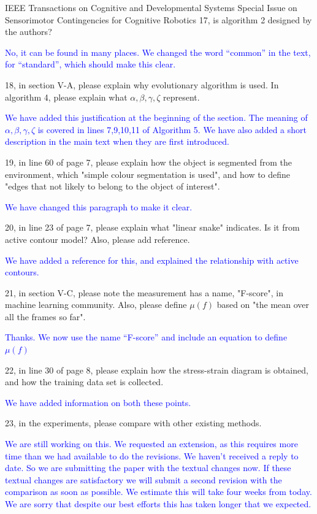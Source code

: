 \documentclass[a4paper,12pt]{letter}
\newcommand{\comment}[1]{\textcolor{blue}{#1}}
\begin{document}
\begin{letter}{IEEE Transactions on Cognitive and Developmental Systems\newline
Special Issue on Sensorimotor Contingencies for Cognitive Robotics}
17, is algorithm 2 designed by the authors?

\comment{No, it can be found in many places.  We changed the word ``common'' in the text, for ``standard'', which should make this clear.}

18, in section V-A, please explain why evolutionary algorithm is used. In algorithm 4, please explain what $\alpha, \beta, \gamma, \zeta$ represent.

\comment{We have added this justification at the beginning of the section.  The meaning of $\alpha, \beta, \gamma, \zeta$ is covered in lines 7,9,10,11 of Algorithm 5. We have also added a short description in the main text when they are first introduced.}

19, in line 60 of page 7, please explain how the object is segmented from the environment, which "simple colour segmentation is used", and how to define "edges that not likely to belong to the object of interest".

\comment{We have changed this paragraph to make it clear.}

20, in line 23 of page 7, please explain what "linear snake" indicates. Is it from active contour model? Also, please add reference. 

\comment{We have added a reference for this, and explained the relationship with active contours.}

\newpage 

21, in section V-C, please note the measurement has a name, "F-score", in machine learning community. Also, please define $\mu(f)$ based on "the mean over all the frames so far".

\comment{Thanks. We now use the name ``F-score'' and include an equation to define $\mu(f)$}

22, in line 30 of page 8, please explain how the stress-strain diagram is obtained, and how the training data set is collected. 

\comment{We have added information on both these points.}

23, in the experiments, please compare with other existing methods.

\comment{We are still working on this. We requested an extension, as this requires more time than we had available to do the revisions. We haven't received a reply to date. So we are submitting the paper with the textual changes now. If these textual changes are satisfactory we will submit a second revision with the comparison as soon as possible. We estimate this will take four weeks from today. We are sorry that despite our best efforts this has taken longer that we expected.}


\end{letter}
\end{document}
